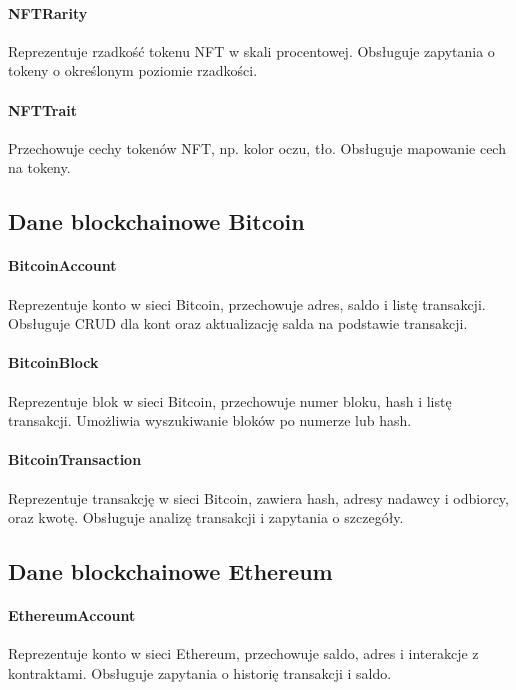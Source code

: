 \paragraph{NFTRarity} Reprezentuje rzadkość tokenu NFT w skali procentowej. Obsługuje zapytania o tokeny o określonym poziomie rzadkości.

\paragraph{NFTTrait} Przechowuje cechy tokenów NFT, np. kolor oczu, tło. Obsługuje mapowanie cech na tokeny.

\subsection{Dane blockchainowe Bitcoin}

\paragraph{BitcoinAccount} Reprezentuje konto w sieci Bitcoin, przechowuje adres, saldo i listę transakcji. Obsługuje CRUD dla kont oraz aktualizację salda na podstawie transakcji.

\paragraph{BitcoinBlock} Reprezentuje blok w sieci Bitcoin, przechowuje numer bloku, hash i listę transakcji. Umożliwia wyszukiwanie bloków po numerze lub hash.

\paragraph{BitcoinTransaction} Reprezentuje transakcję w sieci Bitcoin, zawiera hash, adresy nadawcy i odbiorcy, oraz kwotę. Obsługuje analizę transakcji i zapytania o szczegóły.

\subsection{Dane blockchainowe Ethereum}

\paragraph{EthereumAccount} Reprezentuje konto w sieci Ethereum, przechowuje saldo, adres i interakcje z kontraktami. Obsługuje zapytania o historię transakcji i saldo.

